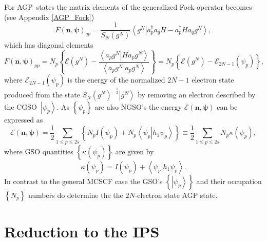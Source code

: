 \documentclass[titlepage]{article}%
\begin{document}
For AGP\ states the matrix elements of the generalized Fock operator becomes
(see Appendix \ref{AGP_Fock})
\begin{equation}
F\left(  \bm{n},\bm{\psi}\right)  _{qp}=\frac{1}{S_{N}\left(  g^{N}\right)
}\left\langle \left.  g^{N}\right\vert a_{p}^{\dagger}a_{q}H-a_{p}^{\dagger
}Ha_{q}g^{N}\right\rangle ,
\end{equation}
which has diagonal elements
\begin{equation}
F\left(  \bm{n},\bm{\psi}\right)  _{pp}=N_{p}\left\{  \mathcal{E}\left(
g^{N}\right)  -\frac{\left\langle \left.  a_{p}g^{N}\right\vert Ha_{p}%
g^{N}\right\rangle }{\left\langle \left.  a_{p}g^{N}\right\vert a_{p}%
g^{N}\right\rangle }\right\}  =N_{p}\left\{  \mathcal{E}\left(  g^{N}\right)
-\mathcal{E}_{2N-1}\left(  \psi_{p}\right)  \right\}  ,
\end{equation}
where $\mathcal{E}_{2N-1}\left(  \psi_{p}\right)  $ is the energy of the
normalized $2N-1$ electron state produced from the state $S_{N}\left(
g^{N}\right)  ^{-\frac{1}{2}}\left\vert g^{N}\right\rangle $ by removing an
electron described by the CGSO\ $\left\vert \psi_{p}\right\rangle $. As
$\left\{  \psi_{p}\right\}  $ are also NGSO's the energy $\mathcal{E}\left(
\bm{n},\bm{\psi}\right)  $ can be expressed as
\begin{equation}
\mathcal{E}\left(  \bm{n},\bm{\psi}\right)  =\frac{1}{2}\sum_{1\leq p\leq
2s}\left\{  N_{p}I\left(  \psi_{p}\right)  +N_{p}\left\langle \left.  \psi
_{p}\right\vert h_{1}\psi_{p}\right\rangle \right\}  \equiv\frac{1}{2}%
{\textstyle\sum\limits_{1\leq p\leq2s}}
N_{p}\kappa\left(  \psi_{p}\right)  ,
\end{equation}
where GSO quantities $\left\{  \kappa\left(  \psi_{p}\right)  \right\}  $ are
given by
\begin{equation}
\kappa\left(  \psi_{p}\right)  =I\left(  \psi_{p}\right)  +\left\langle
\left.  \psi_{p}\right\vert h_{1}\psi_{p}\right\rangle .
\end{equation}
In contrast to the general MCSCF case the GSO's $\left\{  \left\vert \psi
_{p}\right\rangle \right\}  $ and their occupation $\left\{  N_{p}\right\}  $
numbers do determine the the $2N$-electron state AGP state.

\section{Reduction to the IPS \label{IPS}}
\end{document}
